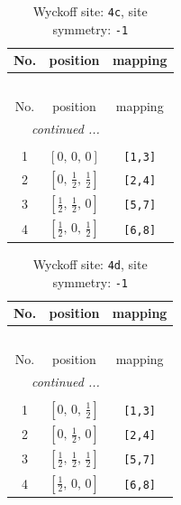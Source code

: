 \documentclass[fleqn,8pt]{jsarticle}
\begin{document}
\renewcommand{\arraystretch}{1.2}
\begin{longtable}{ccc}
\caption{Wyckoff site: {\tt 4c}, site symmetry: {\tt -1}}
 \\
 \hline \hline
No. & position & mapping \\ \hline \endfirsthead

\multicolumn{2}{l}{\tablename\ \thetable{}} \\
 \hline \hline
No. & position & mapping \\ \hline \endhead

 \hline \hline
\multicolumn{2}{r}{\footnotesize\it continued ...} \\ \endfoot

 \hline \hline
\multicolumn{2}{r}{} \\ \endlastfoot

1 & $\left[ 0,\, 0,\, 0 \right]$ & {\tt [1,3]} \\ \hline
2 & $\left[ 0,\, \frac{1}{2},\, \frac{1}{2} \right]$ & {\tt [2,4]} \\ \hline
3 & $\left[ \frac{1}{2},\, \frac{1}{2},\, 0 \right]$ & {\tt [5,7]} \\ \hline
4 & $\left[ \frac{1}{2},\, 0,\, \frac{1}{2} \right]$ & {\tt [6,8]} \\
\end{longtable}
\renewcommand{\arraystretch}{1.2}
\begin{longtable}{ccc}
\caption{Wyckoff site: {\tt 4d}, site symmetry: {\tt -1}}
 \\
 \hline \hline
No. & position & mapping \\ \hline \endfirsthead

\multicolumn{2}{l}{\tablename\ \thetable{}} \\
 \hline \hline
No. & position & mapping \\ \hline \endhead

 \hline \hline
\multicolumn{2}{r}{\footnotesize\it continued ...} \\ \endfoot

 \hline \hline
\multicolumn{2}{r}{} \\ \endlastfoot

1 & $\left[ 0,\, 0,\, \frac{1}{2} \right]$ & {\tt [1,3]} \\ \hline
2 & $\left[ 0,\, \frac{1}{2},\, 0 \right]$ & {\tt [2,4]} \\ \hline
3 & $\left[ \frac{1}{2},\, \frac{1}{2},\, \frac{1}{2} \right]$ & {\tt [5,7]} \\ \hline
4 & $\left[ \frac{1}{2},\, 0,\, 0 \right]$ & {\tt [6,8]} \\
\end{longtable}
\end{document}
